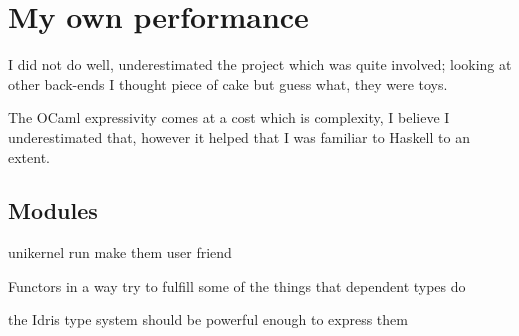 \citep{blackholes}
\citep{Abedon1994}
\citep{AbedonHymanThomas2003}
\citep{website:fermentas-lambda}


\section{My own performance }
I did not do well, underestimated the project
which was quite involved; looking at other back-ends 
I thought piece of cake but guess what, they were
toys. 

The OCaml expressivity comes at a cost which is complexity,
I believe I underestimated that, however it helped that
I was familiar to Haskell to an extent. 


\subsection{Modules}
unikernel run
make them user friend

Functors in a way try to fulfill some of the things that
dependent types do


the Idris type system should be powerful enough to express them